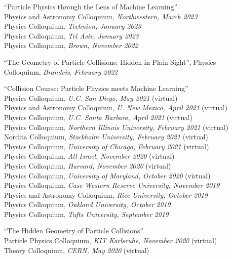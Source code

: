 \bbl

\item ``Particle Physics through the Lens of Machine Learning''
\\ \sh Physics and Astronomy Colloquium, \emph{Northwestern, March 2023}
\\ \sh Physics Colloquium, \emph{Technion, January 2023}
\\ \sh Physics Colloquium, \emph{Tel Aviv, January 2023}
\\ \sh Physics Colloquium, \emph{Brown, November 2022}

\item ``The Geometry of Particle Collisions: Hidden in Plain Sight'', Physics Colloquium, \emph{Brandeis, February 2022}

\item ``Collision Course:  Particle Physics meets Machine Learning''
\\ \sh Physics Colloquium, \emph{U.C. San Diego, May 2021} (virtual)
\\ \sh Physics and Astronomy Colloquium, \emph{U. New Mexico, April 2021} (virtual)
\\ \sh Physics Colloquium, \emph{U.C. Santa Barbara, April 2021} (virtual)
\\ \sh Physics Colloquium, \emph{Northern Illinois University, February 2021} (virtual)
\\ \sh Nordita Colloquium, \emph{Stockholm University, February 2021} (virtual)
\\ \sh Physics Colloquium, \emph{University of Chicago, February 2021} (virtual)
\\ \sh Physics Colloquium, \emph{All Israel, November 2020} (virtual)
\\ \sh Physics Colloquium, \emph{Harvard, November 2020} (virtual)
\\ \sh Physics Colloquium, \emph{University of Maryland, October 2020} (virtual)
\\ \sh Physics Colloquium, \emph{Case Western Reserve University, November 2019}
\\ \sh Physics and Astronomy Colloquium, \emph{Rice University, October 2019}
\\ \sh Physics Colloquium, \emph{Oakland University, October 2019}
\\ \sh Physics Colloquium, \emph{Tufts University, September 2019}

\item ``The Hidden Geometry of Particle Collisions''
\\ \sh Particle Physics Colloquium, \emph{KIT Karlsruhe, November 2020} (virtual)
\\ \sh Theory Colloquium, \emph{CERN, May 2020} (virtual)

